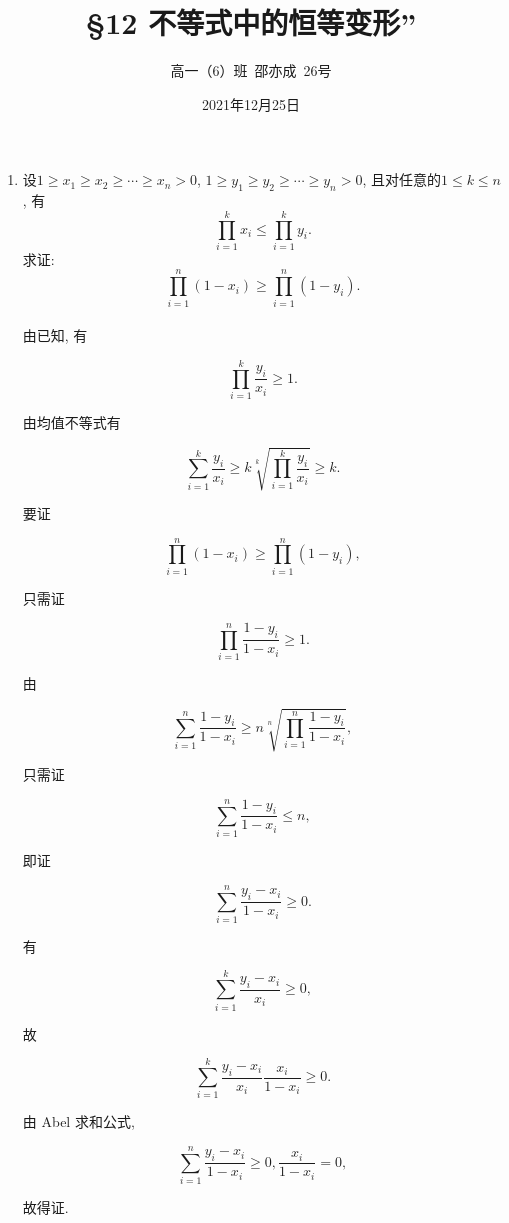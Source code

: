 \documentclass[8pt]{article}
\title{\S 12 不等式中的恒等变形''}
\author{高一（6）班\ 邵亦成\ 26号}
\date{2021年12月25日}
\begin{document}
	\maketitle

	\begin{enumerate}
		\item 设$1\geq x_1 \geq x_2 \geq \cdots \geq x_n > 0$, $1\geq y_1\geq y_2\geq \cdots\geq y_n>0$, 且对任意的$1\leq k\leq n$, 有$$\prod_{i=1}^{k} x_i \leq \prod_{i=1}^{k} y_i.$$求证: $$\prod_{i=1}^{n} (1-x_i) \geq \prod_{i=1}^{n} (1-y_i).$$
			~\\

			由已知, 有

			$$\prod_{i=1}^{k} \frac{y_i}{x_i} \geq 1.$$

			由均值不等式有

			$$\sum_{i=1}^{k} \frac{y_i}{x_i} \geq k\sqrt[k]{\prod_{i=1}^{k} \frac{y_i}{x_i}} \geq k.$$

			要证

			$$\prod_{i=1}^{n} (1-x_i) \geq \prod_{i=1}^{n} (1-y_i),$$

			只需证

			$$\prod_{i=1}^{n} \frac{1-y_i}{1-x_i} \geq 1.$$

			由

			$$\sum_{i=1}^{n} \frac{1-y_i}{1-x_i} \geq n\sqrt[n]{\prod_{i=1}^{n}\frac{1-y_i}{1-x_i}},$$

			只需证

			$$\sum_{i=1}^{n} \frac{1-y_i}{1-x_i}\leq n,$$

			即证

			$$\sum_{i=1}^{n} \frac{y_i - x_i}{1 - x_i} \geq 0.$$

			有

			$$\sum_{i=1}^{k} \frac{y_i-x_i}{x_i} \geq 0,$$

			故

			$$\sum_{i=1}^{k} \frac{y_i - x_i}{x_i} \frac{x_i}{1-x_i} \geq 0.$$

			由 Abel 求和公式,

			$$\sum_{i=1}^{n} \frac{y_i-x_i}{1-x_i} \geq 0, \frac{x_i}{1-x_i}=0,$$

			故得证.

	\end{enumerate}
\end{document}
